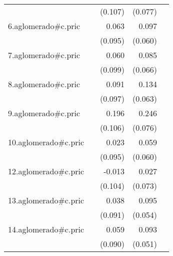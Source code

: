 {\begin{longtable}{l*{4}{D{.}{.}{-1}}}
            &                     &     (0.107)         &     (0.077)         &                     \\
\addlinespace
6.aglomerado#c.pric&                     &       0.063         &       0.097         &                     \\
            &                     &     (0.095)         &     (0.060)         &                     \\
\addlinespace
7.aglomerado#c.pric&                     &       0.060         &       0.085         &                     \\
            &                     &     (0.099)         &     (0.066)         &                     \\
\addlinespace
8.aglomerado#c.pric&                     &       0.091         &       0.134\sym{*}  &                     \\
            &                     &     (0.097)         &     (0.063)         &                     \\
\addlinespace
9.aglomerado#c.pric&                     &       0.196         &       0.246\sym{**} &                     \\
            &                     &     (0.106)         &     (0.076)         &                     \\
\addlinespace
10.aglomerado#c.pric&                     &       0.023         &       0.059         &                     \\
            &                     &     (0.095)         &     (0.060)         &                     \\
\addlinespace
12.aglomerado#c.pric&                     &      -0.013         &       0.027         &                     \\
            &                     &     (0.104)         &     (0.073)         &                     \\
\addlinespace
13.aglomerado#c.pric&                     &       0.038         &       0.095         &                     \\
            &                     &     (0.091)         &     (0.054)         &                     \\
\addlinespace
14.aglomerado#c.pric&                     &       0.059         &       0.093         &                     \\
            &                     &     (0.090)         &     (0.051)         &                     \\

\end{longtable}}
